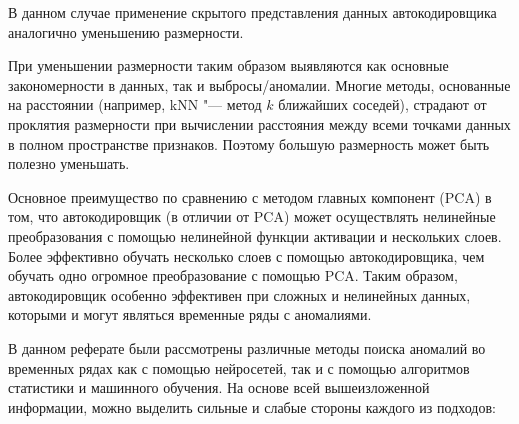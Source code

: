 \documentclass[bachelor, och, referat]{../shiza}
\begin{document}
    В данном случае применение скрытого представления данных автокодировщика
    аналогично уменьшению размерности.

    При уменьшении размерности таким образом выявляются как основные
    закономерности в данных, так и выбросы/аномалии. Многие методы, основанные
    на расстоянии (например, kNN "--- метод $k$ ближайших соседей), страдают от
    проклятия размерности при вычислении расстояния между всеми точками данных в
    полном пространстве признаков. Поэтому большую размерность может быть
    полезно уменьшать.

    Основное преимущество по сравнению с методом главных компонент (PCA) в том,
    что автокодировщик (в отличии от PCA) может осуществлять нелинейные
    преобразования с помощью нелинейной функции активации и нескольких слоев.
    Более эффективно обучать несколько слоев с помощью автокодировщика, чем
    обучать одно огромное преобразование с помощью PCA. Таким образом,
    автокодировщик особенно эффективен при сложных и нелинейных данных, которыми
    и могут являться временные ряды с аномалиями.

\conclusion

    В данном реферате были рассмотрены различные методы поиска аномалий во
    временных рядах как с помощью нейросетей, так и с помощью алгоритмов
    статистики и машинного обучения. На основе всей вышеизложенной информации,
    можно выделить сильные и слабые стороны каждого из подходов:
\end{document}
